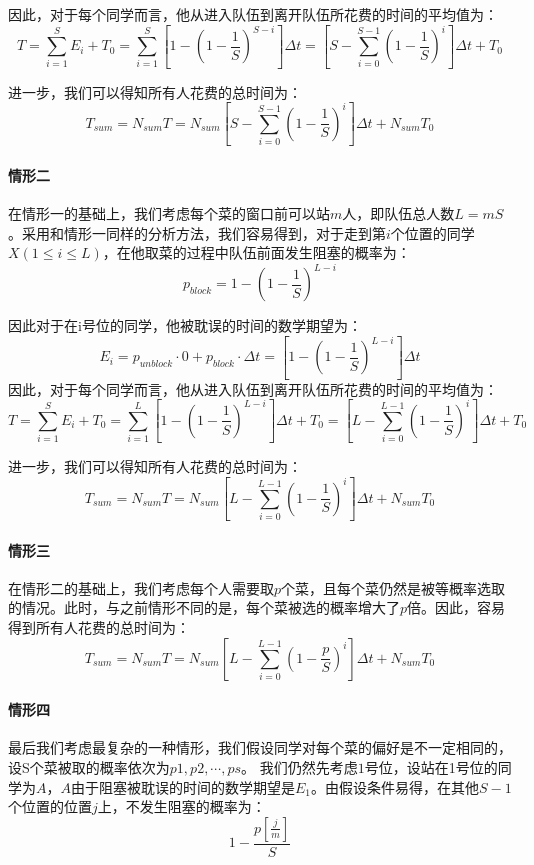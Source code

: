 \documentclass[lang=cn,10pt,a4paper]{elegantpaper}
\begin{document}
因此，对于每个同学而言，他从进入队伍到离开队伍所花费的时间的平均值为：
$$
T=\sum_{i=1}^SE_i + T_0=\sum_{i=1}^S[1-(1-\frac{1}{S})^{S-i}]\Delta t=[S-\sum_{i=0}^{S-1}(1-\frac{1}{S})^i]\Delta t + T_0
$$

进一步，我们可以得知所有人花费的总时间为：
\begin{equation}
T_{sum}=N_{sum}T=N_{sum}[S-\sum_{i=0}^{S-1}(1-\frac{1}{S})^i]\Delta t + N_{sum}T_0
\end{equation}

 
\paragraph{情形二}


在情形一的基础上，我们考虑每个菜的窗口前可以站$m$人，即队伍总人数$L=mS$。采用和情形一同样的分析方法，我们容易得到，对于走到第$i$个位置的同学$X(1 \leqslant i \leqslant L)$，在他取菜的过程中队伍前面发生阻塞的概率为：
$$
p_{block}=1-(1-\frac{1}{S})^{L-i}
$$


因此对于在i号位的同学，他被耽误的时间的数学期望为：
$$
E_i=p_{unblock} \cdot 0+p_{block} \cdot \Delta t = [1-(1-\frac{1}{S})^{L-i}]\Delta t
$$ 
因此，对于每个同学而言，他从进入队伍到离开队伍所花费的时间的平均值为：
$$
T=\sum_{i=1}^SE_i + T_0=\sum_{i=1}^L[1-(1-\frac{1}{S})^{L-i}]\Delta t + T_0=[L-\sum_{i=0}^{L-1}(1-\frac{1}{S})^i]\Delta t + T_0
$$


进一步，我们可以得知所有人花费的总时间为：
\begin{equation}
T_{sum}=N_{sum}T=N_{sum}[L-\sum_{i=0}^{L-1}(1-\frac{1}{S})^i]\Delta t + N_{sum}T_0
\end{equation}


\paragraph{情形三}


在情形二的基础上，我们考虑每个人需要取$p$个菜，且每个菜仍然是被等概率选取的情况。此时，与之前情形不同的是，每个菜被选的概率增大了$p$倍。因此，容易得到所有人花费的总时间为：
\begin{equation}
T_{sum}=N_{sum}T=N_{sum}[L-\sum_{i=0}^{L-1}(1-\frac{p}{S})^i]\Delta t + N_{sum}T_0
\end{equation}


\paragraph{情形四}


最后我们考虑最复杂的一种情形，我们假设同学对每个菜的偏好是不一定相同的，设S个菜被取的概率依次为$p1,p2,\cdots,ps$。
我们仍然先考虑$1$号位，设站在1号位的同学为$A$，$A$由于阻塞被耽误的时间的数学期望是$E_1$。由假设条件易得，在其他$S-1$个位置的位置$j$上，不发生阻塞的概率为：
$$
1-\frac{p[\frac{j}{m}]}{S}
$$
\end{document}
